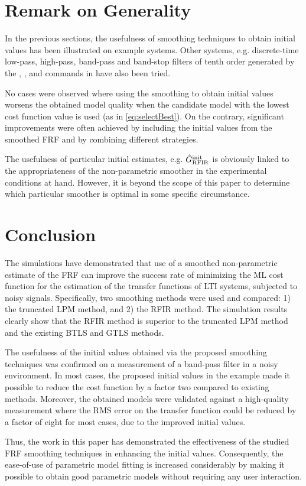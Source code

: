 \section{Remark on Generality}
\label{se:Generality}
In the previous sections, the usefulness of smoothing techniques to obtain initial values has been illustrated on example systems.
Other systems, e.g. discrete-time low-pass, high-pass, band-pass and band-stop filters of tenth order generated by the , ,  and  commands in \MATLAB{} have also been tried.

No cases were observed where using the smoothing to obtain initial values worsens the obtained model quality when the candidate model with the lowest cost function value is used (as in \eqref{eq:selectBest}).
On the contrary, significant improvements were often achieved by including the initial values from the smoothed FRF and by combining different strategies.

The usefulness of particular initial estimates, e.g. $\model[init]{RFIR}$ is obviously linked to the appropriateness of the non-parametric smoother in the experimental conditions at hand.
However, it is beyond the scope of this paper to determine which particular smoother is optimal in some specific circumstance.


\section{Conclusion}\label{se:Conclusion}
The simulations have demonstrated that use of a smoothed non-parametric estimate of the \gls{FRF} can improve the success rate of minimizing the \gls{ML} cost function for the estimation of the transfer functions of \gls{LTI} systems, subjected to noisy signals. Specifically, two smoothing methods were used and compared: 1) the truncated \gls{LPM} method, and 2) the \gls{RFIR} method. The simulation results clearly show that the \gls{RFIR} method is superior to the truncated \gls{LPM} method and the existing \gls{BTLS} and \gls{GTLS} methods.

The usefulness of the initial values obtained via the proposed smoothing techniques was confirmed on a measurement of a band-pass filter in a noisy environment.
In most cases, the proposed initial values in the example made it possible to reduce the cost function by a factor two compared to existing methods.
Moreover, the obtained models were validated against a high-quality measurement where the \gls{RMS} error on the transfer function could be reduced by a factor of eight for most cases, due to the improved initial values.

Thus, the work in this paper has demonstrated the effectiveness of the studied \gls{FRF} smoothing techniques in enhancing the initial values.
Consequently, the ease-of-use of parametric model fitting is increased considerably by making it possible to obtain good parametric models without requiring any user interaction.
